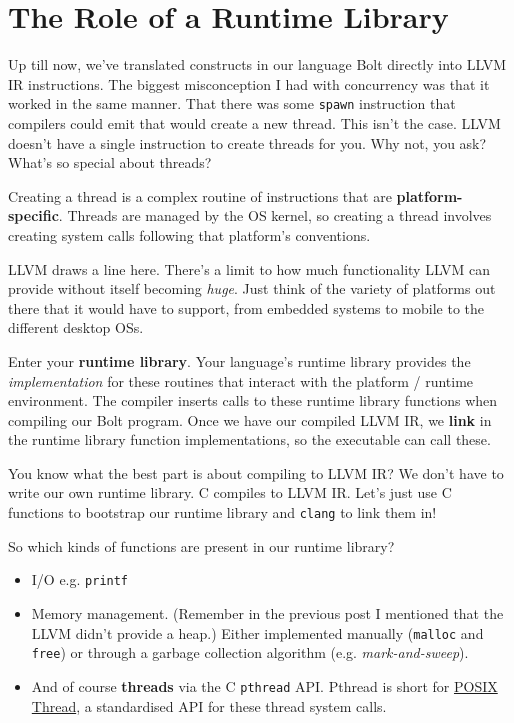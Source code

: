 \hypertarget{the-role-of-a-runtime-library}{%
\section{\texorpdfstring{\protect\hyperlink{the-role-of-a-runtime-library}{}The
Role of a Runtime
Library}{The Role of a Runtime Library}}\label{the-role-of-a-runtime-library}}

Up till now, we've translated constructs in our language Bolt directly
into LLVM IR instructions. The biggest misconception I had with
concurrency was that it worked in the same manner. That there was some
\texttt{spawn} instruction that compilers could emit that would create a
new thread. This isn't the case. LLVM doesn't have a single instruction
to create threads for you. Why not, you ask? What's so special about
threads?

Creating a thread is a complex routine of instructions that are
\textbf{platform-specific}. Threads are managed by the OS kernel, so
creating a thread involves creating system calls following that
platform's conventions.

LLVM draws a line here. There's a limit to how much functionality LLVM
can provide without itself becoming \emph{huge}. Just think of the
variety of platforms out there that it would have to support, from
embedded systems to mobile to the different desktop OSs.

Enter your \textbf{runtime library}. Your language's runtime library
provides the \emph{implementation} for these routines that interact with
the platform / runtime environment. The compiler inserts calls to these
runtime library functions when compiling our Bolt program. Once we have
our compiled LLVM IR, we \textbf{link} in the runtime library function
implementations, so the executable can call these.

You know what the best part is about compiling to LLVM IR? We don't have
to write our own runtime library. C compiles to LLVM IR. Let's just use
C functions to bootstrap our runtime library and \texttt{clang} to link
them in!

So which kinds of functions are present in our runtime library?

\begin{itemize}
\tightlist
\item
  I/O e.g. \texttt{printf}
\item
  Memory management. (Remember in the previous post I mentioned that the
  LLVM didn't provide a heap.) Either implemented manually
  (\texttt{malloc} and \texttt{free}) or through a garbage collection
  algorithm (e.g. \emph{mark-and-sweep}).
\item
  And of course \textbf{threads} via the C \texttt{pthread} API. Pthread
  is short for \href{https://en.wikipedia.org/wiki/POSIX_Threads}{POSIX
  Thread}, a standardised API for these thread system calls.
\end{itemize}


